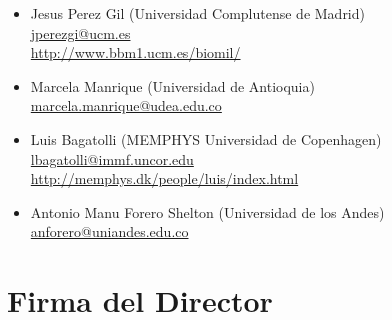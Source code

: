 \documentclass[12pt]{article}
\begin{document}

\begin{itemize}
\item	Jesus Perez Gil (Universidad Complutense de Madrid)\\
\href{mailto:jperezgi@ucm.es}{jperezgi@ucm.es}\\
\href{http://www.bbm1.ucm.es/biomil/}{http://www.bbm1.ucm.es/biomil/}
\item Marcela Manrique (Universidad de Antioquia)\\
\href{mailto:marcela.manrique@udea.edu.co}{marcela.manrique@udea.edu.co}
\item Luis Bagatolli  (MEMPHYS Universidad de Copenhagen)\\
\href{mailto:lbagatolli@immf.uncor.edu}{lbagatolli@immf.uncor.edu}\\
\href{http://memphys.dk/people/luis/index.html}{http://memphys.dk/people/luis/index.html}
\item Antonio Manu Forero Shelton (Universidad de los Andes)\\
\href{mailto:anforero@uniandes.edu.co}{anforero@uniandes.edu.co}
\end{itemize}









\section*{Firma del Director}
\vspace{1.5cm}
\end{document}
